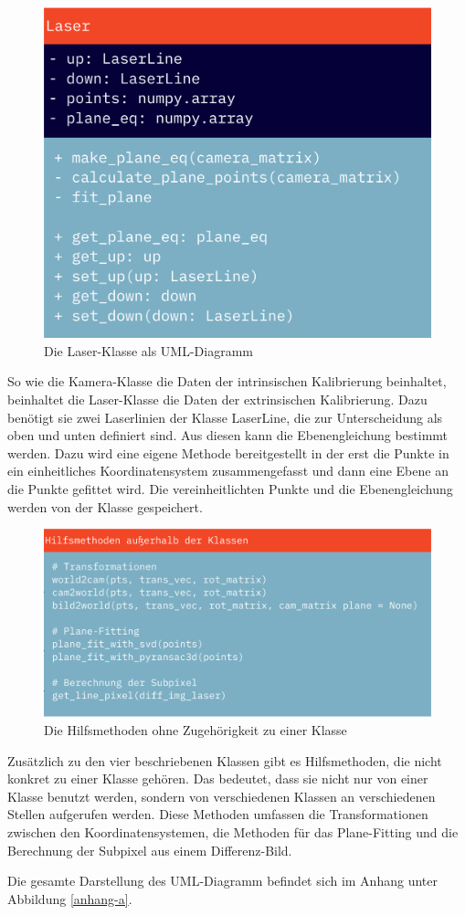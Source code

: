 		\begin{figure}[h]
			\centering
			\includegraphics[width=0.35\linewidth]{img/hauptteil/software/Laser_UML.png}
			\caption{Die Laser-Klasse als UML-Diagramm}
			\label{fig:laser_uml}
		\end{figure}
		So wie die Kamera-Klasse die Daten der intrinsischen Kalibrierung beinhaltet, beinhaltet die Laser-Klasse die Daten der extrinsischen Kalibrierung. Dazu benötigt sie zwei Laserlinien der Klasse LaserLine, die zur Unterscheidung als \glqq oben\grqq{} und \glqq unten\grqq{} definiert sind. Aus diesen kann die Ebenengleichung bestimmt werden. Dazu wird eine eigene Methode bereitgestellt in der erst die Punkte in ein einheitliches Koordinatensystem zusammengefasst und dann eine Ebene an die Punkte gefittet wird. Die vereinheitlichten Punkte und die Ebenengleichung werden von der Klasse gespeichert.
		\newpage
		\begin{figure}[h]
			\centering
			\includegraphics[width=0.7\linewidth]{img/hauptteil/software/Hilfsmethoden_UML.png}
			\caption{Die Hilfsmethoden ohne Zugehörigkeit zu einer Klasse}
			\label{fig:hilfsmethoden_uml}
		\end{figure}
		Zusätzlich zu den vier beschriebenen Klassen gibt es Hilfsmethoden, die nicht konkret zu einer Klasse gehören. Das bedeutet, dass sie nicht nur von einer Klasse benutzt werden, sondern von verschiedenen Klassen an verschiedenen Stellen aufgerufen werden. Diese Methoden umfassen die Transformationen zwischen den Koordinatensystemen, die Methoden für das Plane-Fitting und die Berechnung der Subpixel aus einem Differenz-Bild.
		
		Die gesamte Darstellung des UML-Diagramm befindet sich im Anhang unter Abbildung \ref{anhang-a}.
		
